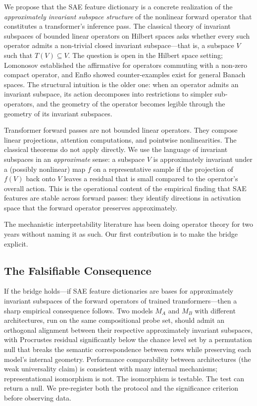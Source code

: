 We propose that the SAE feature dictionary is a concrete realization of
the \emph{approximately invariant subspace structure} of the nonlinear
forward operator that constitutes a transformer's inference pass. The
classical theory of invariant subspaces of bounded linear operators on
Hilbert spaces \cite{lomonosov1973invariant, enflo1987nontrivial,
beauzamy1988introduction, aronszajn1954invariant} asks whether every
such operator admits a non-trivial closed invariant subspace---that is,
a subspace $V$ such that $T(V) \subseteq V$. The question is open in
the Hilbert space setting; Lomonosov \cite{lomonosov1973invariant}
established the affirmative for operators commuting with a non-zero
compact operator, and Enflo \cite{enflo1987nontrivial} showed
counter-examples exist for general Banach spaces. The structural
intuition is the older one: when an operator admits an invariant
subspace, its action decomposes into restrictions to simpler
sub-operators, and the geometry of the operator becomes legible through
the geometry of its invariant subspaces.

Transformer forward passes are not bounded linear operators. They
compose linear projections, attention computations, and pointwise
nonlinearities. The classical theorems do not apply directly. We use
the language of invariant subspaces in an \emph{approximate} sense: a
subspace $V$ is approximately invariant under a (possibly nonlinear)
map $f$ on a representative sample if the projection of $f(V)$ back
onto $V$ leaves a residual that is small compared to the operator's
overall action. This is the operational content of the empirical
finding that SAE features are stable across forward passes: they
identify directions in activation space that the forward operator
preserves approximately.

The mechanistic interpretability literature has been doing operator
theory for two years without naming it as such. Our first contribution
is to make the bridge explicit.

\subsection*{The Falsifiable Consequence}

If the bridge holds---if SAE feature dictionaries are bases for
approximately invariant subspaces of the forward operators of trained
transformers---then a sharp empirical consequence follows. Two models
$M_A$ and $M_B$ with different architectures, run on the same
compositional probe set, should admit an orthogonal alignment between
their respective approximately invariant subspaces, with Procrustes
residual significantly below the chance level set by a permutation null
that breaks the semantic correspondence between rows while preserving
each model's internal geometry. Performance comparability between
architectures (the weak universality claim) is consistent with many
internal mechanisms; representational isomorphism is not. The
isomorphism is testable. The test can return a null. We pre-register
both the protocol and the significance criterion before observing data.

